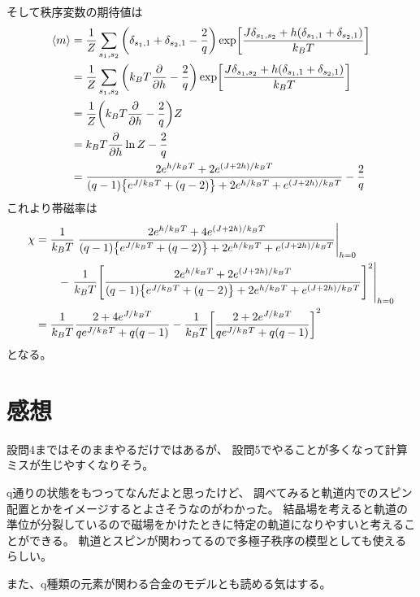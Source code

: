 \documentclass[../ap_2009.tex]{subfiles}
\begin{document}
そして秩序変数の期待値は
\begin{equation}\begin{aligned}[b]
    \ev{m}
    &= \frac{1}{Z}\sum_{s_1,s_2}\qty(\delta_{s_1,1}+\delta_{s_2,1}-\frac{2}{q})
        \exp[\frac{J\delta_{s_1,s_2}+h(\delta_{s_1,1}+\delta_{s_2,1})}{k_BT}]\\
    &= \frac{1}{Z}\sum_{s_1,s_2}\qty(k_BT\pdv{h}-\frac{2}{q})
        \exp[\frac{J\delta_{s_1,s_2}+h(\delta_{s_1,1}+\delta_{s_2,1})}{k_BT}]\\
    &= \frac{1}{Z}\qty(k_BT\pdv{h}-\frac{2}{q})Z\\
    &= k_BT\pdv{h}\ln Z - \frac{2}{q}\\
    &= \frac{2e^{h/k_BT}+2e^{(J+2h)/k_BT}}{(q-1)\qty{e^{J/k_BT}+(q-2)}+2e^{h/k_BT}+e^{(J+2h)/k_BT}}-\frac{2}{q}
\end{aligned}\end{equation}
これより帯磁率は
\begin{equation}\begin{aligned}[b]
    \chi
    &=\frac{1}{k_BT}\left.\frac{2e^{h/k_BT}+4e^{(J+2h)/k_BT}}{(q-1)\qty{e^{J/k_BT}+(q-2)}+2e^{h/k_BT}+e^{(J+2h)/k_BT}}\right|_{h=0}\\
    &\qquad-\left.\frac{1}{k_BT}\qty[\frac{2e^{h/k_BT}+2e^{(J+2h)/k_BT}}{(q-1)\qty{e^{J/k_BT}+(q-2)}+2e^{h/k_BT}+e^{(J+2h)/k_BT}}]^2\right|_{h=0}\\
    &= \frac{1}{k_BT}\frac{2+4e^{J/k_BT}}{qe^{J/k_BT}+q(q-1)}-\frac{1}{k_BT}\qty[\frac{2+2e^{J/k_BT}}{qe^{J/k_BT}+q(q-1)}]^2
\end{aligned}\end{equation}
となる。

\section*{感想}
設問4まではそのままやるだけではあるが、
設問5でやることが多くなって計算ミスが生じやすくなりそう。

q通りの状態をもつってなんだよと思ったけど、
調べてみると軌道内でのスピン配置とかをイメージするとよさそうなのがわかった。
結晶場を考えると軌道の準位が分裂しているので磁場をかけたときに特定の軌道になりやすいと考えることができる。
軌道とスピンが関わってるので多極子秩序の模型としても使えるらしい。

また、q種類の元素が関わる合金のモデルとも読める気はする。
\end{document}
